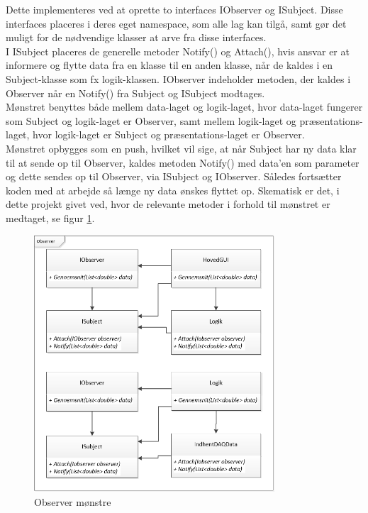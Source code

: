 Dette implementeres ved at oprette to interfaces IObserver og ISubject. Disse interfaces placeres i deres eget namespace, som alle lag kan tilgå, samt gør det muligt for de nødvendige klasser at arve fra disse interfaces. \\
I ISubject placeres de generelle metoder Notify() og Attach(), hvis ansvar er at informere og flytte data fra en klasse til en anden klasse, når de kaldes i en Subject-klasse som fx logik-klassen. IObserver indeholder metoden, der kaldes i Observer når en Notify() fra Subject og ISubject modtages.\\ Mønstret benyttes både mellem data-laget og logik-laget, hvor data-laget fungerer som Subject og logik-laget er Observer, samt mellem logik-laget og præsentations-laget, hvor logik-laget er Subject og præsentations-laget er Observer. \\
Mønstret opbygges som en push, hvilket vil sige, at når Subject har ny data klar til at sende op til Observer, kaldes metoden Notify() med data’en som parameter og dette sendes op til Observer, via ISubject og IObserver. Således fortsætter koden med at arbejde så længe ny data ønskes flyttet op. Skematisk er det, i dette projekt givet ved, hvor de relevante metoder i forhold til mønstret er medtaget, se figur \ref{fig:implementeret_observer_moenster}.
\begin{figure}[H]
	\centering
	\includegraphics[width=0.8\textwidth]{Figurer/ObserverStrategy}
	\caption{Observer mønstre}
	\label{fig:implementeret_observer_moenster}
\end{figure}

